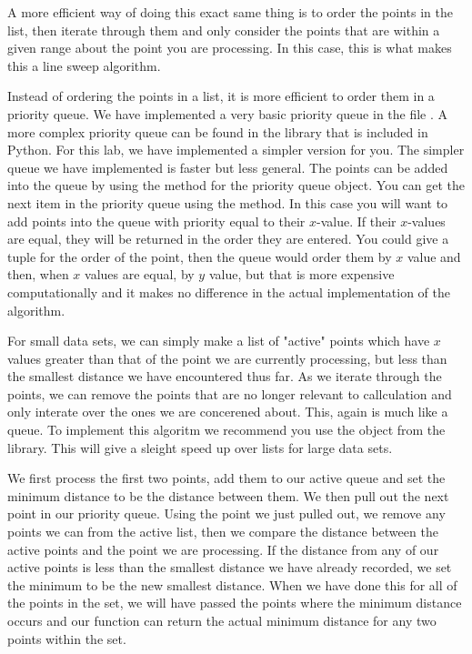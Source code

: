 A more efficient way of doing this exact same thing is to order the points in the list, then iterate through them and only consider the points that are within a given range about the point you are processing. 
In this case, this is what makes this a line sweep algorithm. 

Instead of ordering the points in a list, it is more efficient to order them in a priority queue. 
We have implemented a very basic priority queue in the file . 
A more complex priority queue can be found in the library  that is included in Python. 
For this lab, we have implemented a simpler version for you. 
The simpler queue we have implemented is faster but less general. 
The points can be added into the queue by using the  method for the priority queue object. 
You can get the next item in the priority queue using the  method. 
In this case you will want to add points into the queue with priority equal to their $x$-value. 
If their $x$-values are equal, they will be returned in the order they are entered. 
You could give a tuple for the order of the point, then the queue would order them by $x$ value and then, when $x$ values are equal, by $y$ value, but that is more expensive computationally and it makes no difference in the actual implementation of the algorithm. 

For small data sets, we can simply make a list of "active" points which have $x$ values greater than that of the point we are currently processing, but less than the smallest distance we have encountered thus far. 
As we iterate through the points, we can remove the points that are no longer relevant to callculation and only interate over the ones we are concerened about. 
This, again is much like a queue. 
To implement this algoritm we recommend you use the  object from the  library. 
This will give a sleight speed up over lists for large data sets. 

We first process the first two points, add them to our active queue and set the minimum distance to be the distance between them. 
We then pull out the next point in our priority queue. 
Using the point we just pulled out, we remove any points we can from the active list, then we compare the distance between the active points and the point we are processing. 
If the distance from any of our active points is less than the smallest distance we have already recorded, we set the minimum to be the new smallest distance. 
When we have done this for all of the points in the set, we will have passed the points where the minimum distance occurs and our function can return the actual minimum distance for any two points within the set.


